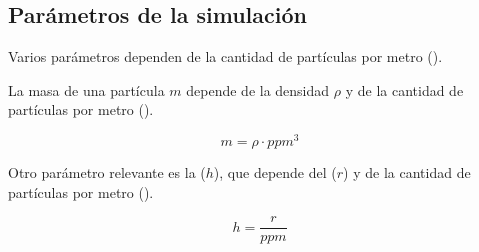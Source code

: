 \subsection{Parámetros de la simulación}

Varios parámetros dependen de la cantidad de partículas por metro
().

La masa de una partícula $m$ depende de la densidad $\rho$ y de la cantidad de
partículas por metro ().

\[
m = \rho \cdot ppm^3
\]

Otro parámetro relevante es la  ($h$), que
depende del  ($r$) y de la cantidad de
partículas por metro ().

\[
h = \frac{r}{ppm}
\]
